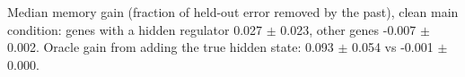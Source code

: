 Median memory gain (fraction of held-out error removed by the past), clean main condition: genes with a hidden regulator 0.027 $\pm$ 0.023, other genes -0.007 $\pm$ 0.002. Oracle gain from adding the true hidden state: 0.093 $\pm$ 0.054 vs -0.001 $\pm$ 0.000.